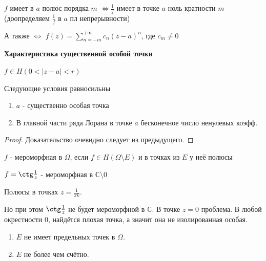 \begin{remark}
    $f$ имеет в $a$ полюс порядка $m$ $\Longleftrightarrow \frac{1}{f}$ имеет в
    точке $a$ ноль кратности $m$ (доопределяем $\frac{1}{f}$ в $a$ пл непрерывности)

    А также $\Longleftrightarrow$ $f(z) = \sum_{n = -m}^{+\infty} c_n (z - a)^n$, где $c_m \neq 0$
\end{remark}

\begin{theorem}
    \textbf{Характеристика существенной особой точки}

    $f \in H(0 < |z - a| < r)$

    Следующие условия равносильны

    \begin{enumerate}
        \item $a$ - существенно особая точка
        \item В главной части ряда Лорана в точке $a$ бесконечное число ненулевых коэфф.
    \end{enumerate}
\end{theorem}

\begin{proof}
    Доказательство очевидно следует из предыдущего.
\end{proof}

\begin{definition}
    $f$ - мероморфная в $\Omega$, если $f \in H(\Omega \setminus E)$ и в точках из $E$ у неё полюсы
\end{definition}

\begin{example}
    $f = \ctg \frac{1}{z}$  - мероморфная в $\mathbb{C} \setminus 0$

    Полюсы в точках $z = \frac{1}{\pi k}$.

    Но при этом $\ctg \frac{1}{z}$ не будет мероморфной в $\mathbb{C}$. В точке $z = 0$ проблема.
    В любой окрестности 0, найдётся плохая точка, а значит она не изолированная особая.
\end{example}

\begin{remark}
    \begin{enumerate}
        \item $E$ не имеет предельных точек в $\Omega$.
        \item $E$ не более чем счётно.
    \end{enumerate}
\end{remark}

